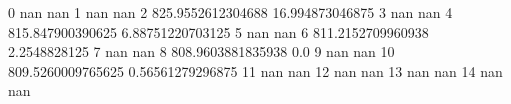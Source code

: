 0 nan nan
1 nan nan
2 825.9552612304688 16.994873046875
3 nan nan
4 815.847900390625 6.88751220703125
5 nan nan
6 811.2152709960938 2.2548828125
7 nan nan
8 808.9603881835938 0.0
9 nan nan
10 809.5260009765625 0.56561279296875
11 nan nan
12 nan nan
13 nan nan
14 nan nan
